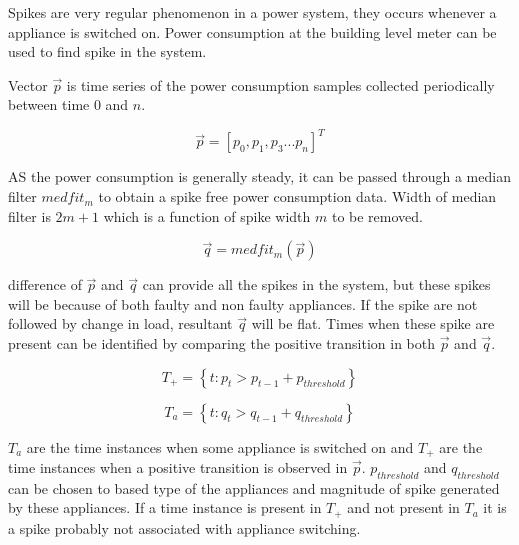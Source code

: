 



Spikes are very regular phenomenon in a power system, they occurs whenever a appliance is switched on. %
Power consumption at the building level meter can be used to find spike in the system.

Vector $\vec{p}$ is time series of the power consumption samples collected periodically between time $0$ and  $n$. 

$$\vec{p} = [ p_0, p_1, p_3 ... p_n  ]^T $$

AS the power consumption is generally steady, it can be passed through a median filter $medfit_m$ to obtain a spike free power consumption data. Width of median filter is $2 m + 1$ which is a function of spike width $m$ to be removed. 

$$ \vec{q} = medfit_m(\vec{p}) $$

difference of $\vec{p}$ and $\vec{q}$ can provide all the spikes in the system, but these spikes will be because of both faulty and non faulty appliances. If the spike are not followed by change in load, resultant $\vec{q}$ will be flat. Times when these spike are present can be identified by comparing the  positive transition in both $\vec{p}$ and $\vec{q}$. 

$$T_+ = \left \{ t :  p_t >  p_{t-1} + p_{threshold}   \right \}$$

$$T_a = \left \{ t :  q_t >  q_{t-1} + q_{threshold}  \right \}$$

$T_a$ are the time instances when some appliance is switched on and $T_+$ are the time instances when a positive transition is observed in $\vec{p}$. $p_{threshold}$ and $q_{threshold}$ can be chosen to based type of the appliances and magnitude of spike generated by these appliances. If a time instance is present in $T_+$ and not present in $T_a$ it is a spike probably not associated with appliance switching.

